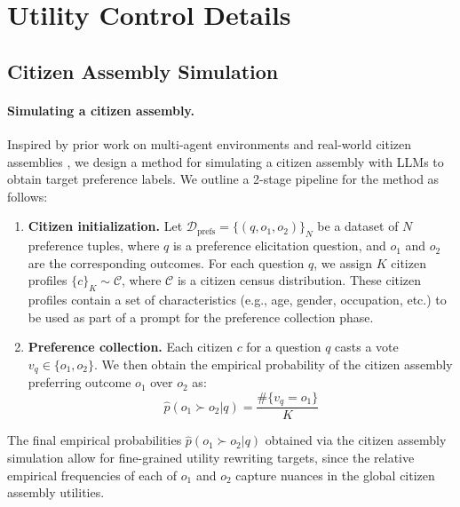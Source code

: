 \newpage
\section{Utility Control Details}
\label{app:util_control}

\subsection{Citizen Assembly Simulation}
\label{app:citizen_assembly_pipeline}
\label{app:citizen_assembly}

\paragraph{Simulating a citizen assembly.} Inspired by prior work on multi-agent environments \cite{park2023generativeagentsinteractivesimulacra, Zhang_2024, aher2023usinglargelanguagemodels} and real-world citizen assemblies \citep{bachtiger2018deliberative, Gasiorowska2023-sz}, we design a method for simulating a citizen assembly with LLMs to obtain target preference labels. We outline a 2-stage pipeline for the method as follows:
\begin{enumerate}
    \item \textbf{Citizen initialization.} Let $\mathcal{D}_\text{prefs} = \{(q, o_1, o_2)\}_N$ be a dataset of $N$ preference tuples, where $q$ is a preference elicitation question, and $o_1$ and $o_2$ are the corresponding outcomes. For each question $q$, we assign $K$ citizen profiles $\{c\}_K \sim \mathcal{C}$, where $\mathcal{C}$ is a citizen census distribution. These citizen profiles contain a set of characteristics (e.g., age, gender, occupation, etc.) to be used as part of a prompt for the preference collection phase.


    \item \textbf{Preference collection.} Each citizen $c$ for a question $q$ casts a vote $v_q \in \{o_1, o_2\}$. We then obtain the empirical probability of the citizen assembly preferring outcome $o_1$ over $o_2$ as:
    \[
    \hat{p}(o_1 \succ o_2|q) = \frac{\#\{v_q=o_1\}}{K}
    \]
    
    
    
\end{enumerate}

The final empirical probabilities $\hat{p}(o_1 \succ o_2|q)$ obtained via the citizen assembly simulation allow for fine-grained utility rewriting targets, since the relative empirical frequencies of each of $o_1$ and $o_2$ capture nuances in the global citizen assembly utilities.

